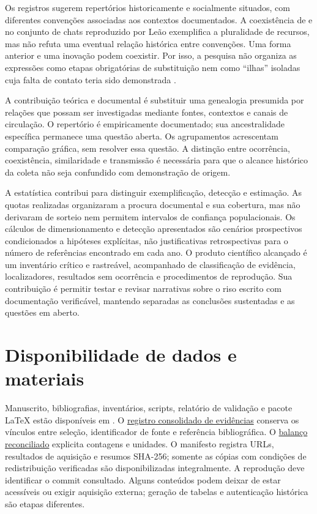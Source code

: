 Os registros sugerem repertórios historicamente e socialmente situados, com diferentes convenções associadas aos contextos documentados. A coexistência de  e  no conjunto de chats reproduzido por Leão exemplifica a pluralidade de recursos, mas não refuta uma eventual relação histórica entre convenções. Uma forma anterior e uma inovação podem coexistir. Por isso, a pesquisa não organiza as expressões como etapas obrigatórias de substituição nem como ``ilhas'' isoladas cuja falta de contato teria sido demonstrada \cite{leao2010}.

A contribuição teórica e documental é substituir uma genealogia presumida por relações que possam ser investigadas mediante fontes, contextos e canais de circulação. O repertório é empiricamente documentado; sua ancestralidade específica permanece uma questão aberta. Os agrupamentos acrescentam comparação gráfica, sem resolver essa questão. A distinção entre ocorrência, coexistência, similaridade e transmissão é necessária para que o alcance histórico da coleta não seja confundido com demonstração de origem.

A estatística contribui para distinguir exemplificação, detecção e estimação. As quotas realizadas organizaram a procura documental e sua cobertura, mas não derivaram de sorteio nem permitem intervalos de confiança populacionais. Os cálculos de dimensionamento e detecção apresentados são cenários prospectivos condicionados a hipóteses explícitas, não justificativas retrospectivas para o número de referências encontrado em cada ano. O produto científico alcançado é um inventário crítico e rastreável, acompanhado de classificação de evidência, localizadores, resultados sem ocorrência e procedimentos de reprodução. Sua contribuição é permitir testar e revisar narrativas sobre o riso escrito com documentação verificável, mantendo separadas as conclusões sustentadas e as questões em aberto.

\section*{Disponibilidade de dados e materiais}
Manuscrito, bibliografias, inventários, scripts, relatório de validação e pacote LaTeX estão disponíveis em \repo. O \href{https://github.com/murilloed/historia-riso-escrito-portugues/blob/main/data/evidence_register.csv}{registro consolidado de evidências} conserva os vínculos entre seleção, identificador de fonte e referência bibliográfica. O \href{https://github.com/murilloed/historia-riso-escrito-portugues/blob/main/data/consolidated_inventory.json}{balanço reconciliado} explicita contagens e unidades. O manifesto registra URLs, resultados de aquisição e resumos SHA-256; somente as cópias com condições de redistribuição verificadas são disponibilizadas integralmente. A reprodução deve identificar o commit consultado. Alguns conteúdos podem deixar de estar acessíveis ou exigir aquisição externa; geração de tabelas e autenticação histórica são etapas diferentes.

